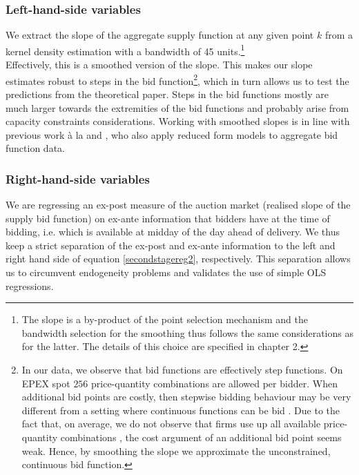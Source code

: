 \subsubsection{Left-hand-side variables}
\label{LHS}
We extract the slope of the aggregate supply function at any given point $k$ from a kernel density estimation with a bandwidth of 45 units.\footnote{The
slope is a by-product of the point selection mechanism and the bandwidth selection for the smoothing thus follows the same considerations as for the latter. The details of this choice are specified in chapter 2.}  \\

Effectively, this is a smoothed version of the slope. This makes our slope estimates robust to steps in the bid function\footnote{In our data, we observe that bid functions are effectively step functions. On EPEX spot $256$ price-quantity combinations are allowed per bidder. When additional bid points are costly, then stepwise bidding behaviour may be very different from a setting where continuous functions can be bid \cite{kastl2011discrete}. Due to the fact that, on average, we do not observe that firms use up all available price-quantity combinations , the cost argument of an additional bid point seems weak. Hence, by smoothing the slope we approximate the unconstrained, continuous bid function. }, which in turn allows us to test the predictions from the theoretical paper. 
Steps in the bid functions mostly are much larger towards the extremities of the bid functions and probably arise from capacity constraints considerations. 
Working with smoothed slopes is  in line with previous work \`{a} la \cite{pw2002etude} and \cite{ozcan2004logistic}, who also apply reduced form models to aggregate bid function data. 


\subsubsection{Right-hand-side variables}
\label{RHS}

We are regressing an ex-post measure of the auction market (realised slope of the supply bid function) on ex-ante information that bidders have at the time of bidding, i.e. which is available at midday of the day ahead of delivery.  
We thus keep a strict separation of the ex-post and  ex-ante information to the left  and right hand side of equation \ref{secondstagereg2}, respectively. This separation allows us to circumvent endogeneity problems and  validates the use of simple OLS regressions. \\

